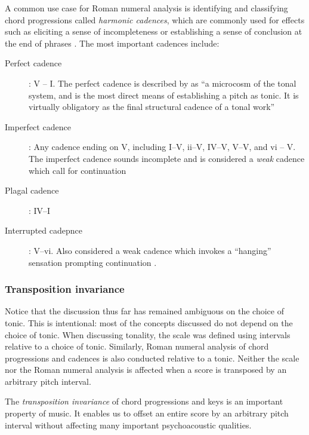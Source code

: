 A common use case for Roman numeral analysis is identifying and classifying
chord progressions called \emph{harmonic cadences}, which are commonly used for
effects such as eliciting a sense of incompleteness
\citep{jonas1982introduction} or establishing a sense of conclusion at the end
of phrases \citep{randel1999harvard}. The most important cadences include:
\begin{description}
  \item[Perfect cadence]: \RN{5} -- \RN{1}. The perfect cadence is described by
    \citet{randel1999harvard} as ``a microcosm of the tonal system, and is the
    most direct means of establishing a pitch as tonic. It is virtually
    obligatory as the final structural cadence of a tonal work''
  \item[Imperfect cadence]: Any cadence ending on \RN{5}, including
    \RN{1}--\RN{5}, \Rn{2}--\RN{5}, \RN{4}--\RN{5}, \RN{5}--\RN{5}, and \Rn{6}
    -- \RN{5}. The imperfect cadence sounds incomplete and is considered
    a \emph{weak} cadence which call for continuation \citep{jonas1982introduction}
  \item[Plagal cadence]: \RN{4}--\RN{1}
  \item[Interrupted cadepnce]: \RN{5}--\Rn{6}. Also considered a weak cadence
    which invokes a ``hanging'' sensation prompting continuation
    \cite{piston1978harmony}.
\end{description}

\subsubsection{Transposition invariance}\label{sec:transposition-invariance}

Notice that the discussion thus far has remained ambiguous on the choice of
tonic. This is intentional: most of the concepts discussed do not depend on the
choice of tonic. When discussing tonality, the scale was defined using
intervals relative to a choice of tonic. Similarly, Roman numeral analysis of
chord progressions and cadences is also conducted relative to a tonic. Neither
the scale nor the Roman numeral analysis is affected when a score is transposed
by an arbitrary pitch interval.

The \emph{transposition invariance} of chord progressions and keys is an
important property of music. It enables us to offset an entire score by an
arbitrary pitch interval without affecting many important psychoacoustic
qualities.

